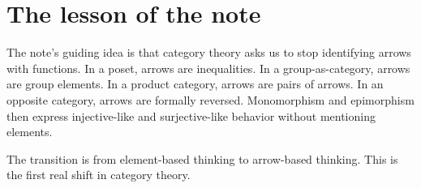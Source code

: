 \section{The lesson of the note}

The note's guiding idea is that category theory asks us to stop identifying arrows with functions.  In a poset, arrows are inequalities.  In a group-as-category, arrows are group elements.  In a product category, arrows are pairs of arrows.  In an opposite category, arrows are formally reversed.  Monomorphism and epimorphism then express injective-like and surjective-like behavior without mentioning elements.

The transition is from element-based thinking to arrow-based thinking.  This is the first real shift in category theory.
